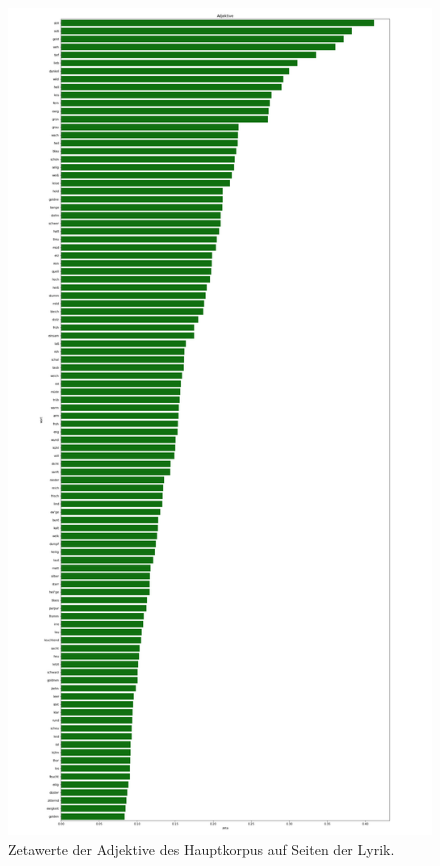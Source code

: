 \documentclass[a4paper,10p]{article}
\begin{document}
\begin{figure}{}
    \centering
    \begin{minipage}[b]{.45\linewidth}
        \centering
        \includegraphics[width=.6\linewidth]{haupt_adjektive_pro_wort.png}
        \caption{Zetawerte der Adjektive des Hauptkorpus auf Seiten der Lyrik.}
        \label{haupt_adjektive}
    \end{minipage}
    \hfill
    \begin{minipage}[b]{.45\linewidth}
        \centering

\end{minipage}
\end{figure}
\end{document}
